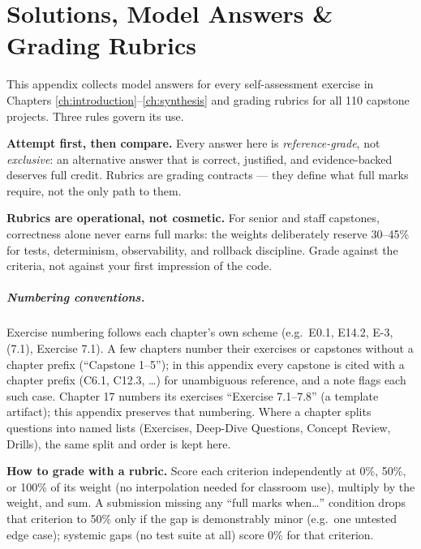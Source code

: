 \chapter{Solutions, Model Answers \& Grading Rubrics}
\label{ch:solutions}

This appendix collects model answers for every self-assessment exercise in
Chapters \ref{ch:introduction}--\ref{ch:synthesis} and grading rubrics for all
110 capstone projects. Three rules govern its use.

\begin{keyconceptbox}
\textbf{Attempt first, then compare.} Every answer here is
\emph{reference-grade}, not \emph{exclusive}: an alternative answer that is
correct, justified, and evidence-backed deserves full credit. Rubrics are
grading contracts --- they define what full marks require, not the only path
to them.
\end{keyconceptbox}

\begin{warningbox}
\textbf{Rubrics are operational, not cosmetic.} For senior and staff
capstones, correctness alone never earns full marks: the weights deliberately
reserve 30--45\% for tests, determinism, observability, and rollback
discipline. Grade against the criteria, not against your first impression of
the code.
\end{warningbox}

\paragraph{Numbering conventions.} Exercise numbering follows each chapter's
own scheme (e.g.\ E0.1, E14.2, E-3, (7.1), Exercise 7.1). A few chapters
number their exercises or capstones without a chapter prefix (``Capstone
1--5''); in this appendix every capstone is cited with a chapter prefix
(C6.1, C12.3, \ldots) for unambiguous reference, and a note flags each such
case. Chapter 17 numbers its exercises ``Exercise 7.1--7.8'' (a template
artifact); this appendix preserves that numbering. Where a chapter splits
questions into named lists (Exercises, Deep-Dive Questions, Concept Review,
Drills), the same split and order is kept here.

\begin{examplebox}
\textbf{How to grade with a rubric.} Score each criterion independently at
0\%, 50\%, or 100\% of its weight (no interpolation needed for classroom
use), multiply by the weight, and sum. A submission missing any
``full marks when\ldots'' condition drops that criterion to 50\% only if the
gap is demonstrably minor (e.g.\ one untested edge case); systemic gaps
(no test suite at all) score 0\% for that criterion.
\end{examplebox}

